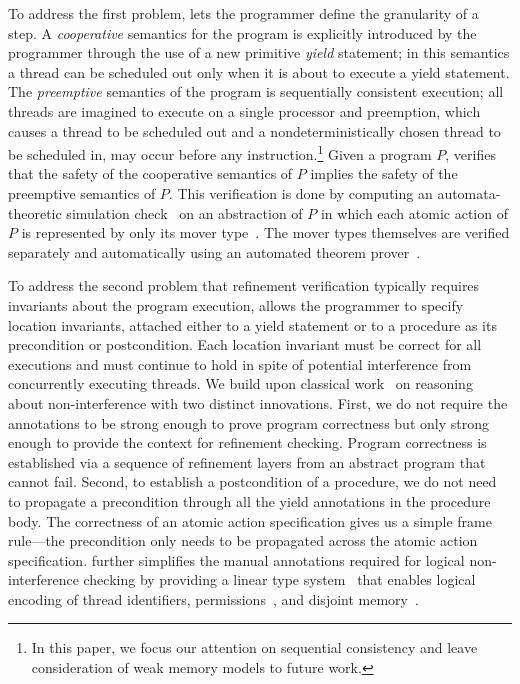 To address the first problem, \civl lets the programmer define the granularity of a step.
A {\em cooperative\/} semantics for the program is explicitly introduced by the programmer 
through the use of a new primitive {\em yield\/} statement;
in this semantics a thread can be scheduled out only when it is about to execute a yield statement.
The {\em preemptive\/} semantics of the program is sequentially consistent execution; all threads are imagined
to execute on a single processor and preemption, which causes a thread to be scheduled out and a nondeterministically chosen thread to 
be scheduled in, may occur before any instruction.\footnote{In this paper, 
we focus our attention on sequential consistency and leave consideration of weak memory models to future work.}
Given a program $P$, \civl verifies that the safety of the cooperative semantics of $P$ implies the safety of the preemptive semantics of $P$.
This verification is done by computing an automata-theoretic simulation check~\cite{HenzingerHK95} 
on an abstraction of $P$ in which each atomic action of $P$ is represented by only its mover type~\cite{Lipton75,FlanaganFLQ08}. 
The mover types themselves are verified separately and automatically using an automated theorem prover~\cite{MouraB08}.

To address the second problem that refinement verification typically requires invariants about the program execution, 
\civl allows the programmer to specify location invariants, attached either to a yield statement
or to a procedure as its precondition or postcondition.
Each location invariant must be correct for all executions and must continue to hold in spite of potential interference from concurrently executing threads.
We build upon classical work~\cite{OwickiG76,Jones83} on reasoning about non-interference
with two distinct innovations.
First, we do not require the annotations to be strong enough to prove program correctness but only strong enough to provide the context for refinement checking. 
Program correctness is established via a sequence of refinement layers from an abstract program that cannot fail.
Second, to establish a postcondition of a procedure, we do not need to propagate a precondition through all the yield annotations in the procedure body. 
The correctness of an atomic action specification gives us a simple frame rule---the precondition only needs to be propagated across the atomic action specification. 
\civl further simplifies the manual annotations required for logical non-interference checking
by providing a linear type system~\cite{Wadler90lineartypes} that enables logical encoding of thread identifiers, permissions~\cite{boyland:03fractions}, 
and disjoint memory~\cite{LahiriQW11}.

